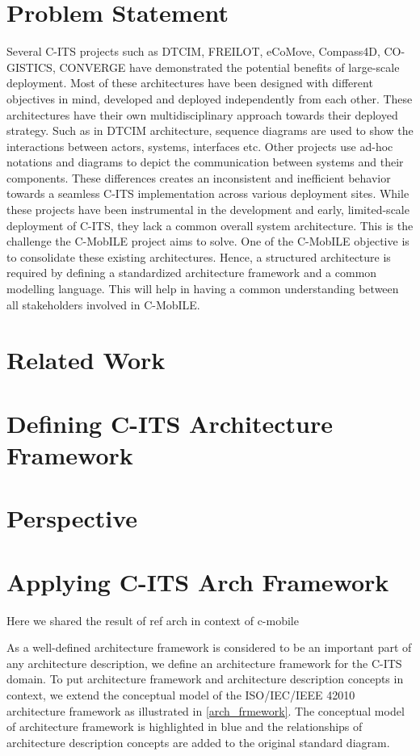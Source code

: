 \documentclass[letterpaper, 10 pt, conference]{ieeeconf}  %
\begin{document}
\section{Problem Statement}

Several C-ITS projects such as DTCIM, FREILOT, eCoMove, Compass4D, CO-GISTICS, CONVERGE have demonstrated the potential benefits of large-scale deployment. Most of these architectures have been designed with different objectives in mind, developed and deployed independently from each other. These architectures have their own multidisciplinary approach towards their deployed strategy. Such as in DTCIM architecture, sequence diagrams are used to show the interactions between actors, systems, interfaces etc. Other projects use ad-hoc notations and diagrams to depict the communication between systems and their components. These differences creates an inconsistent and inefficient behavior towards a seamless C-ITS implementation across various deployment sites. While these projects have been instrumental in the development and early, limited-scale deployment of C-ITS, they lack a common overall system architecture. This is the challenge the C-MobILE project aims to solve. One of the C-MobILE objective is to consolidate these existing architectures. Hence, a structured architecture is required by defining a standardized architecture framework and a common modelling language. This will help in having a common understanding between all stakeholders involved in C-MobILE.

\section{Related Work}

\section{Defining C-ITS Architecture Framework}

\section{Perspective}

\section{Applying C-ITS Arch Framework}

Here we shared the result of ref arch in context of c-mobile

As a well-defined architecture framework is considered to be an important part of any architecture description\cite{arch_desc}, we define an architecture framework for the C-ITS domain. To put architecture framework and architecture description concepts in context, we extend the conceptual model of the ISO/IEC/IEEE 42010 architecture framework as illustrated in \ref{arch_frmework}. The conceptual model of architecture framework is highlighted in blue and the relationships of architecture description concepts are added to the original standard diagram.
\end{document}
